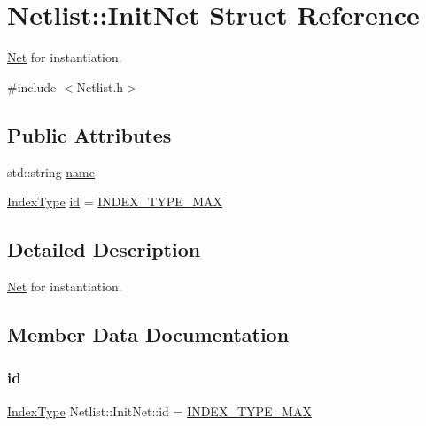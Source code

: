 \hypertarget{structNetlist_1_1InitNet}{}\section{Netlist\+:\+:Init\+Net Struct Reference}
\label{structNetlist_1_1InitNet}


\hyperlink{classNet}{Net} for instantiation.  




{\ttfamily \#include $<$Netlist.\+h$>$}

\subsection*{Public Attributes}
\begin{DoxyCompactItemize}
\item 
std\+::string \hyperlink{structNetlist_1_1InitNet_acb4d378b948bc8e2cd1490f62683ed2d}{name}
\item 
\hyperlink{type_8h_a581e8093e28e7362f2b6937296190676}{Index\+Type} \hyperlink{structNetlist_1_1InitNet_a26ea0dea8ddabe80a0edbb60cd422dcc}{id} = \hyperlink{type_8h_a11591ec4ef05af2b0f48545966a61500}{I\+N\+D\+E\+X\+\_\+\+T\+Y\+P\+E\+\_\+\+M\+AX}
\end{DoxyCompactItemize}


\subsection{Detailed Description}
\hyperlink{classNet}{Net} for instantiation. 

\subsection{Member Data Documentation}
\mbox{\label{structNetlist_1_1InitNet_a26ea0dea8ddabe80a0edbb60cd422dcc}} 
\subsubsection{\texorpdfstring{id}{id}}
{\footnotesize\ttfamily \hyperlink{type_8h_a581e8093e28e7362f2b6937296190676}{Index\+Type} Netlist\+::\+Init\+Net\+::id = \hyperlink{type_8h_a11591ec4ef05af2b0f48545966a61500}{I\+N\+D\+E\+X\+\_\+\+T\+Y\+P\+E\+\_\+\+M\+AX}}

